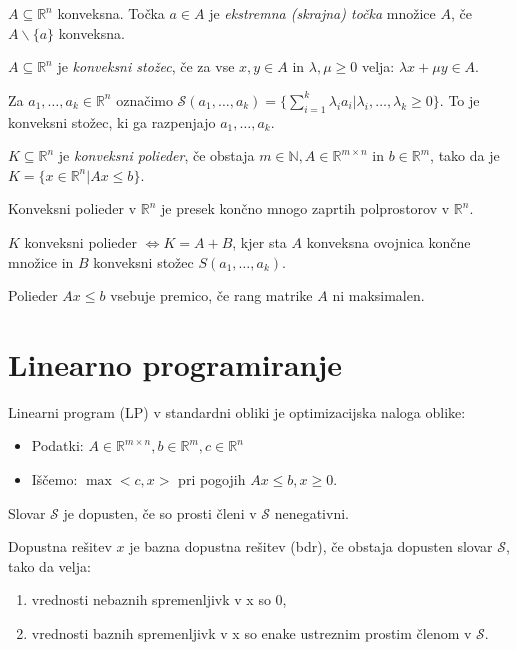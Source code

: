 \documentclass[10pt,a4paper]{amsart}
\theoremstyle{definition} %
\theoremstyle{plain} %
\newcommand{\R}{\mathbb R}
\newcommand{\N}{\mathbb N}
\begin{document}
$A \subseteq \R^n$  konveksna. Točka $a \in A$ je \emph{ekstremna (skrajna) točka} množice $A$, če $A \backslash \{a\}$ konveksna.

$A \subseteq \R^n$  je \emph{konveksni stožec}, če za vse $x,y \in A$ in $\lambda ,\mu \geq 0$ velja: $\lambda x+\mu y \in A$.

Za $a_1,\dots ,a_k \in \R^n$ označimo $\mathcal{S}(a_1, \dots ,a_k) = \{ \sum \limits_{i=1}^{k} \lambda_i a_i | \lambda_i ,\dots , \lambda_k \geq 0 \}$. To je konveksni stožec, ki ga razpenjajo $a_1,\dots , a_k.$

$K  \subseteq \R^n$ je \emph{konveksni polieder}, če obstaja $m \in \N , A \in \R^{m \times n}$ in $b \in \R^m$, tako da je $K = \{ x \in \R^n | Ax \leq b \}$.

Konveksni polieder v $\R^n$ je presek končno mnogo zaprtih polprostorov v $\R^n$.

$K$ konveksni polieder $\Longleftrightarrow K=A+B$, kjer sta $A$ konveksna ovojnica končne množice in $B$ konveksni stožec $S(a_1,\dots ,a_k)$.

Polieder $Ax \leq b$ vsebuje premico, če rang matrike $A$ ni maksimalen.



\section{Linearno programiranje}

Linearni program (LP) v standardni obliki je optimizacijska naloga oblike:

\begin{itemize}
\item Podatki: $A \in \R^{m \times n}, b \in \R^m, c\in \R^n$
\item Iščemo: $\max <c,x>$ pri pogojih $Ax \leq b, x\geq 0$.
\end{itemize}

\thispagestyle{empty}

Slovar $\mathcal{S}$ je dopusten, če so prosti členi v $\mathcal{S}$ nenegativni.

Dopustna rešitev $x$ je bazna dopustna rešitev (bdr), če obstaja dopusten slovar $\mathcal{S}$, tako da velja:
 \begin{enumerate}
 \item vrednosti nebaznih spremenljivk v x so 0,
 \item vrednosti baznih spremenljivk v x so enake ustreznim prostim členom v $\mathcal{S}$.
 \end{enumerate}
\end{document}
